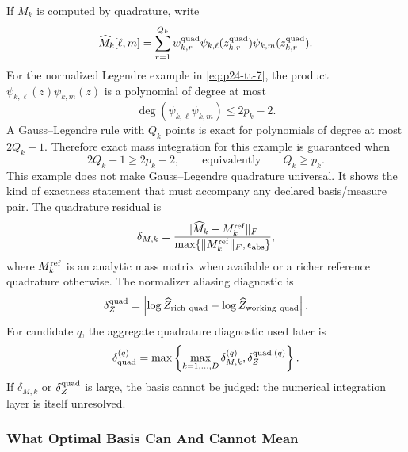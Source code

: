 \documentclass[11pt]{article}
\numberwithin{equation}{section}
\begin{document}
If \(M_k\) is computed by quadrature, write
\begin{equation}
    \widehat M_k[\ell,m]
    =
    \sum_{r=1}^{Q_k}
    w_{k,r}^{\rm quad}
    \psi_{k,\ell}(z_{k,r}^{\rm quad})
    \psi_{k,m}(z_{k,r}^{\rm quad}).
    \label{eq:p33-quadrature-mass}
\end{equation}
For the normalized Legendre example in \eqref{eq:p24-tt-7}, the product
\(\psi_{k,\ell}(z)\psi_{k,m}(z)\) is a polynomial of degree at most
\begin{equation}
    \deg(\psi_{k,\ell}\psi_{k,m})\le 2p_k-2.
    \label{eq:p33-legendre-mass-degree}
\end{equation}
A Gauss--Legendre rule with \(Q_k\) points is exact for polynomials of degree
at most \(2Q_k-1\).  Therefore exact mass integration for this example is
guaranteed when
\begin{equation}
    2Q_k-1\ge 2p_k-2,
    \qquad\text{equivalently}\qquad
    Q_k\ge p_k.
    \label{eq:p33-legendre-quadrature-threshold}
\end{equation}
This example does not make Gauss--Legendre quadrature universal.  It shows the
kind of exactness statement that must accompany any declared basis/measure
pair.
The quadrature residual is
\begin{equation}
    \delta_{M,k}
    =
    \frac{\|\widehat M_k-M_k^{\rm ref}\|_F}
         {\max\{\|M_k^{\rm ref}\|_F,\epsilon_{\rm abs}\}},
    \label{eq:p33-quadrature-residual}
\end{equation}
where \(M_k^{\rm ref}\) is an analytic mass matrix when available or a richer
reference quadrature otherwise.  The normalizer aliasing diagnostic is
\begin{equation}
    \delta_Z^{\rm quad}
    =
    \left|
    \log\widehat Z_{\rm rich\ quad}
    -
    \log\widehat Z_{\rm working\ quad}
    \right|.
    \label{eq:p33-quadrature-z}
\end{equation}
For candidate \(q\), the aggregate quadrature diagnostic used later is
\begin{equation}
    \delta_{\rm quad}^{(q)}
    =
    \max\left\{
    \max_{k=1,\ldots,D}\delta_{M,k}^{(q)},
    \delta_Z^{{\rm quad},(q)}
    \right\}.
    \label{eq:p33-quadrature-aggregate}
\end{equation}
If \(\delta_{M,k}\) or \(\delta_Z^{\rm quad}\) is large, the basis cannot be
judged: the numerical integration layer is itself unresolved.

\subsubsection{What Optimal Basis Can And Cannot Mean}
\end{document}
